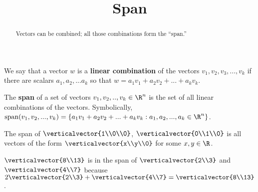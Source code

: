 \documentclass{ximera}
\title{Span}
\begin{document}
\begin{abstract}
  Vectors can be combined; all those combinations form the ``span.''
\end{abstract}

\begin{definition}
  We say that a vector $w$ is a \textbf{linear combination} of the vectors $v_1,v_2,v_3,...,v_k$ if there are scalars $a_1,a_2,...a_k$ 
  so that $w = a_1v_1+a_2v_2+...+a_kv_k$.
\end{definition}
  		
\begin{definition}
  The \textbf{span} of a set of vectors $v_1,v_2, ..,v_k \in \R^n$ is the set of all linear combinations of the vectors.
  Symbolically, $\text{span}(v_1,v_2,...,v_k) = \{ a_1v_1+a_2v_2+...+a_kv_k : a_1,a_2, ...,a_k \in \R^n\}$.
\end{definition}

\begin{example}
  The span of $\verticalvector{1\\0\\0}$, $\verticalvector{0\\1\\0}$ is all vectors of the form $\verticalvector{x\\y\\0}$ for some $x,y \in \R$.
\end{example}

\begin{example}
  $\verticalvector{8\\13}$ is in the span of $\verticalvector{2\\3}$ and $\verticalvector{4\\7}$ because
  $2\verticalvector{2\\3} + \verticalvector{4\\7} = \verticalvector{8\\13}$. 
\end{example}
\end{document}
